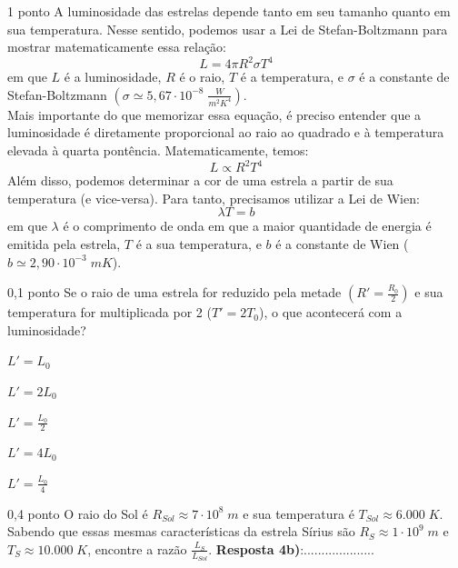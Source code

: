 \documentclass{../lista}
\begin{document}
	\begin{questao}{1 ponto}
		A luminosidade das estrelas depende tanto em seu tamanho quanto em sua temperatura. Nesse sentido, podemos usar a Lei de Stefan-Boltzmann para mostrar matematicamente essa relação:
		\begin{equation}
			L=4 \pi R^2 \sigma T^4
		\end{equation}
		em que $L$ é a luminosidade, $R$ é o raio, $T$ é a temperatura, e $\sigma$ é a constante de Stefan-Boltzmann $\left( \sigma \simeq 5,67 \cdot 10^{-8} \; \frac{W}{m^2K^4} \right)$. \\
		Mais importante do que memorizar essa equação, é preciso entender que a luminosidade é diretamente proporcional ao raio ao quadrado e à temperatura elevada à quarta pontência. Matematicamente, temos:
		\begin{equation}
			L \propto R^2 T^4
		\end{equation}
		Além disso, podemos determinar a cor de uma estrela a partir de sua temperatura (e vice-versa). Para tanto, precisamos utilizar a Lei de Wien:
		\begin{equation}
			\lambda T = b
		\end{equation}
		em que $\lambda$ é o comprimento de onda em que a maior quantidade de energia é emitida pela estrela, $T$ é a sua temperatura, e $b$ é a constante de Wien ($b \simeq 2,90 \cdot 10^{-3} \; mK$).

		\begin{pergunta}{0,1 ponto}
			Se o raio de uma estrela for reduzido pela metade $\left( R'=\frac{R_0}{2} \right)$ e sua temperatura for multiplicada por 2 ($T'=2T_0$), o que acontecerá com a luminosidade?

			\begin{alternativas}
				\item $L'=L_0$
				\item $L'=2L_0$
				\item $L'=\frac{L_0}{2}$
				\item $L'=4L_0$
				\item $L'=\frac{L_0}{4}$
			\end{alternativas}
		\end{pergunta}

		\begin{pergunta}{0,4 ponto}
			O raio do Sol é $R_{Sol} \approx 7 \cdot 10^8 \; m$ e sua temperatura é $T_{Sol} \approx 6.000 \; K$. Sabendo que essas mesmas características da estrela Sírius são $R_S \approx 1 \cdot 10^9 \; m$ e $T_S \approx 10.000 \; K$, encontre a razão $\frac{L_S}{L_{Sol}}$.
			\espacoCalculo
			\textbf{Resposta 4b)}:....................
		\end{pergunta}


\end{questao}
\end{document}
